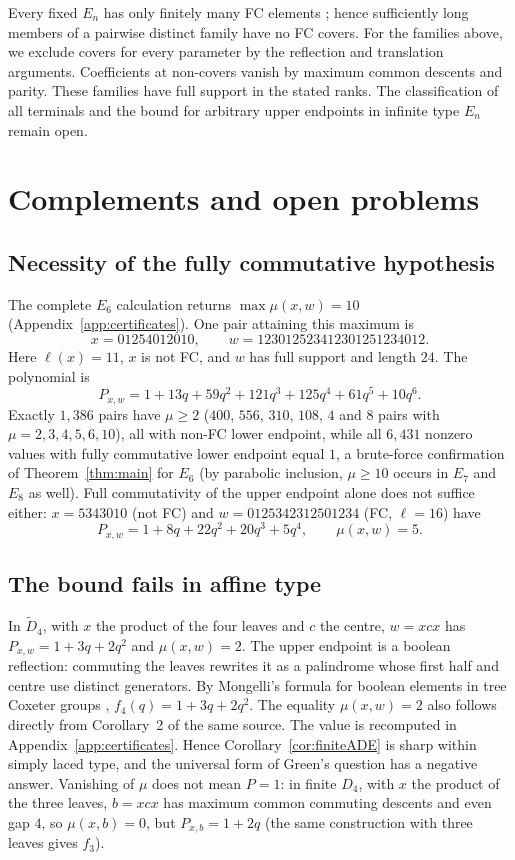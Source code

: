 \documentclass[10pt]{article}
\theoremstyle{remark}
\begin{document}
Every fixed $E_n$ has only finitely many FC elements
\cite[\S5.1]{BJN}; hence sufficiently long members of a
pairwise distinct family have no FC covers. For the families above, we
exclude covers for every parameter by the reflection and translation
arguments. Coefficients at non-covers vanish by maximum common descents
and parity. These families have full support in the stated ranks. The
classification of all terminals and the bound for arbitrary upper
endpoints in infinite type $E_n$ remain open.

\section{Complements and open problems}\label{sec:complements}

\subsection{Necessity of the fully commutative hypothesis}
The complete $E_6$ calculation returns $\max\mu(x,w)=10$
(Appendix~\ref{app:certificates}). One pair attaining this maximum is
\[
 x=01254012010,\qquad w=123012523412301251234012.
\]
Here $\ell(x)=11$, $x$ is not FC, and $w$ has full support and length
$24$. The polynomial is
\[
 P_{x,w}=1+13q+59q^2+121q^3+125q^4+61q^5+10q^6.
\]
Exactly $1{,}386$ pairs
have $\mu\geq2$ ($400$, $556$, $310$, $108$, $4$ and $8$ pairs with
$\mu=2,3,4,5,6,10$), all with non-FC lower endpoint, while all $6{,}431$
nonzero values with fully commutative lower endpoint equal $1$, a
brute-force confirmation of Theorem~\ref{thm:main} for $E_6$ (by parabolic
inclusion, $\mu\geq10$ occurs in $E_7$ and $E_8$ as well). Full
commutativity of the upper endpoint alone does not suffice either:
$x=5343010$ (not FC) and $w=0125342312501234$ (FC, $\ell=16$) have
\[
 P_{x,w}=1+8q+22q^2+20q^3+5q^4,\qquad \mu(x,w)=5.
\]

\subsection{The bound fails in affine type}
In $\widetilde D_4$, with $x$ the product of the four leaves and $c$ the
centre, $w=xcx$ has $P_{x,w}=1+3q+2q^2$ and $\mu(x,w)=2$.
The upper endpoint is a boolean reflection: commuting the leaves rewrites
it as a palindrome whose first half and centre use distinct generators.
By Mongelli's formula for boolean elements in tree Coxeter groups
\cite[Corollary~3]{Mongelli}, $f_4(q)=1+3q+2q^2$. The equality
$\mu(x,w)=2$ also follows directly from Corollary~2 of the same source.
The value is recomputed in Appendix~\ref{app:certificates}. Hence
Corollary~\ref{cor:finiteADE} is sharp within simply laced type, and the
universal form of Green's question has a negative answer. Vanishing of
$\mu$ does not mean $P=1$: in finite $D_4$, with $x$ the product of the
three leaves, $b=xcx$ has maximum common commuting descents and even gap
$4$, so $\mu(x,b)=0$, but $P_{x,b}=1+2q$
\cite[Corollary~3]{Mongelli} (the same construction with three leaves gives $f_3$).
\end{document}
